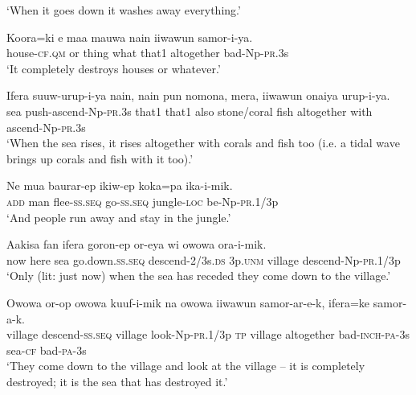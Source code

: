 \glt ‘When it goes down it washes away everything.’ \\
\z


\ea
\gll  Koora=ki  e  maa  mauwa  nain  iiwawun  samor-i-ya. \\
house-\textsc{cf}.\textsc{qm}  or  thing  what  that1  altogether  bad-Np-\textsc{pr}.3s \\
\glt ‘It completely destroys houses or whatever.’ \\
\z


\ea
\gll  Ifera  suuw-urup-i-ya  nain,  nain  pun  nomona,  mera,  iiwawun        onaiya  urup-i-ya. \\
sea  push-ascend-Np-\textsc{pr}.3s  that1  that1  also  stone/coral  fish  altogether  with  ascend-Np-\textsc{pr}.3s \\


\glt ‘When the sea rises, it rises altogether with corals and fish too (i.e. a tidal wave brings up corals and fish with it too).’ \\
\z


\ea
\gll  Ne  mua  baurar-ep  ikiw-ep  koka=pa  ika-i-mik. \\
\textsc{add}  man  flee-\textsc{ss.seq}  go-\textsc{ss.seq}  jungle-\textsc{loc}  be-Np-\textsc{pr}.1/3p \\
\glt ‘And people run away and stay in the jungle.’ \\
\z


\ea
\gll  Aakisa  fan  ifera  goron-ep  or-eya  wi  owowa            ora-i-mik. \\
now  here  sea  go.down.\textsc{ss.seq}  descend-2/3s.\textsc{ds}  3p.\textsc{unm}  village descend-Np-\textsc{pr}.1/3p \\


\glt ‘Only (lit: just now) when the sea has receded they come down to the village.’ \\
\z


\ea
\gll  Owowa  or-op  owowa  kuuf-i-mik  na  owowa  iiwawun                  samor-ar-e-k,  ifera=ke  samor-a-k. \\
village  descend-\textsc{ss.seq}  village  look-Np-\textsc{pr}.1/3p  \textsc{tp}  village  altogether bad-\textsc{inch}-\textsc{pa}-3s  sea-\textsc{cf}  bad-\textsc{pa}-3s \\


\glt ‘They come down to the village and look at the village – it is completely destroyed; it is the sea that has destroyed it.’ \\
\z


